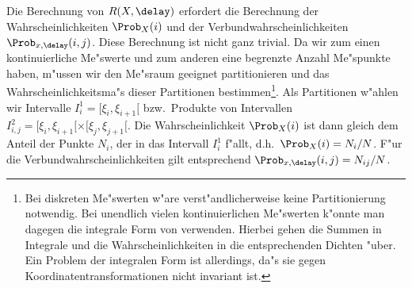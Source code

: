 Die Berechnung von $R(X,\delay)$ erfordert die Berechnung der Wahrscheinlichkeiten
$\Prob_X(i)$ und der Verbundwahrscheinlichkeiten $\Prob_{x,\delay}(i,j)$. Diese Berechnung
ist nicht ganz trivial. Da wir zum einen kontinuierliche Me"swerte und zum anderen eine
begrenzte Anzahl Me"spunkte haben, m"ussen wir den Me"sraum geeignet partitionieren und
das Wahrscheinlichkeitsma"s dieser Partitionen bestimmen\footnote{Bei diskreten Me"swerten
  w"are verst"andlicherweise keine Partitionierung notwendig. Bei unendlich vielen
  kontinuierlichen Me"swerten k"onnte man dagegen die integrale Form von
   verwenden. Hierbei gehen die Summen in Integrale und die
  Wahrscheinlichkeiten in die entsprechenden Dichten "uber. Ein Problem der integralen
  Form ist allerdings, da"s sie gegen Koordinatentransformationen nicht invariant ist.}.
Als Partitionen w"ahlen wir Intervalle $I^1_i=[\xi_i,\xi_{i+1}[$ bzw.\  Produkte von
Intervallen $I^2_{i,j}=[\xi_i,\xi_{i+1}[\times[\xi_j,\xi_{j+1}[$. Die Wahrscheinlichkeit
$\Prob_X(i)$ ist dann gleich dem Anteil der Punkte $N_i$, der in das Intervall $I^1_i$
f"allt, d.h.\  $\Prob_X(i)=N_i/N$. F"ur die Verbundwahrscheinlichkeiten gilt entsprechend
$\Prob_{x,\delay}(i,j)=N_{ij}/N$.

